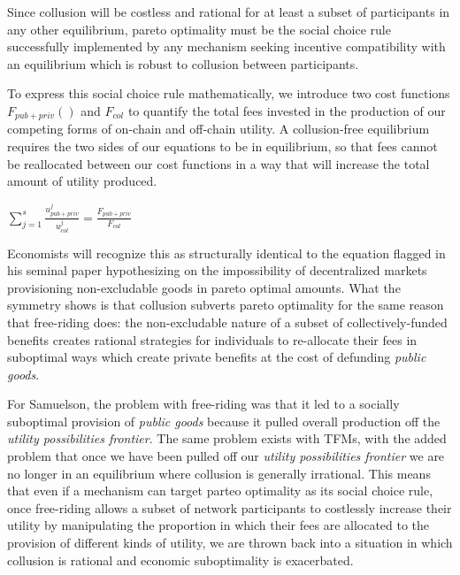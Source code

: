 \documentclass[oneside]{article}   	%
\begin{document}
Since collusion will be costless and rational for at least a subset of participants in any other equilibrium, pareto optimality must be the social choice rule successfully implemented by any mechanism seeking incentive compatibility with an equilibrium which is robust to collusion between participants.

To express this social choice rule mathematically, we introduce two cost functions $F_{{pub} + {priv}}()$ and $F_{col}$ to quantify the total fees invested in the production of our competing forms of on-chain and off-chain utility. A collusion-free equilibrium requires the two sides of our equations to be in equilibrium, so that fees cannot be reallocated between our cost functions in a way that will increase the total amount of utility produced.

\LARGE
\begin{adjustwidth}{1.5em}{1.5em}
\begin{math}
\sum_{j=1}^{s} \frac{u_{{pub}+{priv}}^j}{u_{col}^j} = \frac{F_{{pub} + {priv}}}{F_{col}}
\end{math}
\end{adjustwidth}
\normalsize

Economists will recognize this as structurally identical to the equation \cite{samuelson1954pure} flagged in his seminal paper hypothesizing on the impossibility of decentralized markets provisioning non-excludable goods in pareto optimal amounts. What the symmetry shows is that collusion subverts pareto optimality for the same reason that free-riding does: the non-excludable nature of a subset of collectively-funded benefits creates rational strategies for individuals to re-allocate their fees in suboptimal ways which create private benefits at the cost of defunding \textit{public goods}.

For Samuelson, the problem with free-riding was that it led to a socially suboptimal provision of \textit{public goods} because it pulled overall production off the \textit{utility possibilities frontier}. The same problem exists with TFMs, with the added problem that once we have been pulled off our \textit{utility possibilities frontier} we are no longer in an equilibrium where collusion is generally irrational. This means that even if a mechanism can target parteo optimality as its social choice rule, once free-riding allows a subset of network participants to costlessly increase their utility by manipulating the proportion in which their fees are allocated to the provision of different kinds of utility, we are thrown back into a situation in which collusion is rational and economic suboptimality is exacerbated.
\end{document}
